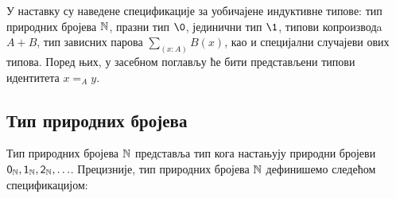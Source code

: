 \documentclass[12pt,oneside]{memoir}
\begin{document}
У наставку су наведене спецификације за уобичајене индуктивне типове: тип природних бројева ${\mathbb{N}}$, празни тип $\0$, јединични тип $\1$, типови копроизводa $A + B$, тип зависних парова $\sum_{(x : A)} B (x)$, као и специјални случајеви ових типова. Поред њих, у засебном поглављу ће бити представљени типови идентитета $x =_{A} y$.

\newpage%

\subsection{Тип природних бројева}

Тип природних бројева ${\mathbb{N}}$ представља тип кога настањују природни бројеви $\mathsf{0}_\mathbb{N}, \mathsf{1}_\mathbb{N}, \mathsf{2}_\mathbb{N}, \ldots$. Прецизније, тип природних бројева ${\mathbb{N}}$ дефинишемо следећом спецификацијом:
\end{document}
